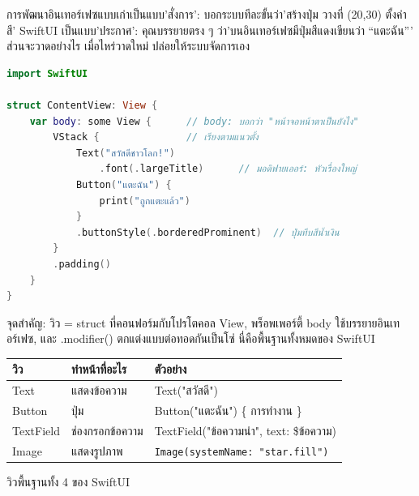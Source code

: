 


การพัฒนาอินเทอร์เฟซแบบเก่าเป็นแบบ'สั่งการ': บอกระบบทีละขั้นว่า'สร้างปุ่ม วางที่ (20,30) ตั้งค่าสี' SwiftUI เป็นแบบ'ประกาศ': คุณบรรยายตรง ๆ ว่า'บนอินเทอร์เฟซมีปุ่มสีแดงเขียนว่า “แตะฉัน”' ส่วนจะวาดอย่างไร เมื่อไหร่วาดใหม่ ปล่อยให้ระบบจัดการเอง

\begin{lstlisting}[language=Swift]
import SwiftUI

struct ContentView: View {
    var body: some View {      // body: บอกว่า "หน้าจอหน้าตาเป็นยังไง"
        VStack {               // เรียงตามแนวตั้ง
            Text("สวัสดีชาวโลก!")
                .font(.largeTitle)      // มอดิฟายเออร์: หัวเรื่องใหญ่
            Button("แตะฉัน") {
                print("ถูกแตะแล้ว")
            }
            .buttonStyle(.borderedProminent)  // ปุ่มทึบสีน้ำเงิน
        }
        .padding()
    }
}
\end{lstlisting}

จุดสำคัญ: วิว = struct ที่คอนฟอร์มกับโปรโตคอล View, พร็อพเพอร์ตี้ body ใช้บรรยายอินเทอร์เฟซ, และ .modifier() ตกแต่งแบบต่อทอดกันเป็นโซ่ นี่คือพื้นฐานทั้งหมดของ SwiftUI


\begin{center}
\begin{tabularx}{\linewidth}{|X|X|X|}
\hline
\textbf{วิว} & \textbf{ทำหน้าที่อะไร} & \textbf{ตัวอย่าง} \tabularnewline
\hline
Text & แสดงข้อความ & Text("สวัสดี") \tabularnewline
Button & ปุ่ม & Button("แตะฉัน") \{ การทำงาน \} \tabularnewline
TextField & ช่องกรอกข้อความ & TextField("ข้อความนำ", text: \$ข้อความ) \tabularnewline
Image & แสดงรูปภาพ & \texttt{Image(systemName: "star.\allowbreak fill")} \tabularnewline
\hline
\end{tabularx}
\end{center}

\begin{center}\small\color{gray}วิวพื้นฐานทั้ง 4 ของ SwiftUI\end{center}

